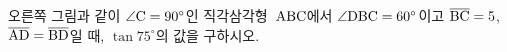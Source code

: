 \noindent\begin{minipage}[t]{0.58\linewidth}\vspace{0pt}\raggedright 오른쪽 그림과 같이 $\angle\mathrm{C}=90^\circ$인 직각삼각형~$\mathrm{ABC}$에서 $\angle\mathrm{DBC}=60^\circ$이고 $\overline{\mathrm{BC}}=5$, $\overline{\mathrm{AD}}=\overline{\mathrm{BD}}$일 때, $\tan 75^\circ$의 값을 구하시오.\end{minipage}\hfill\begin{minipage}[t]{0.4\linewidth}\vspace{0pt}\centering \resizebox{\ifdim\width>\linewidth\linewidth\else\width\fi}{!}{}\end{minipage}\par
